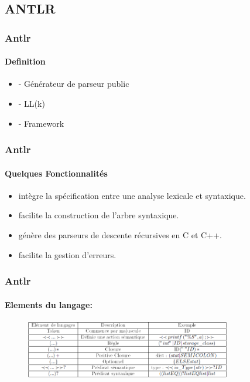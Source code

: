 \documentclass{beamer}
\begin{document}
\subsection{ANTLR}




	\begin{frame}
	\frametitle{Antlr}\framesubtitle{Definition}
 \begin{itemize}
			\item - Générateur de parseur public
			\item - LL(k)
			\item - Framework
			
\end{itemize}
\end{frame} 



		\begin{frame}
	\frametitle{Antlr}\framesubtitle{Quelques Fonctionnalités}
 \begin{itemize}
			\item intègre la spécification entre une analyse lexicale et syntaxique.
			\item facilite la construction de l’arbre syntaxique.
			\item génère des parseurs de descente récursives en C et C++.
			\item facilite la gestion d’erreurs.	
\end{itemize}
\end{frame} 


\begin{frame}
	\frametitle{Antlr}\framesubtitle{Elements du langage:}
	
\begin{figure}[h]
	\centering
		\includegraphics[width=0.80\textwidth]{tabantlr.png}
	\label{fig:tabantlr}
\end{figure}
\end{frame} 
\end{document}
